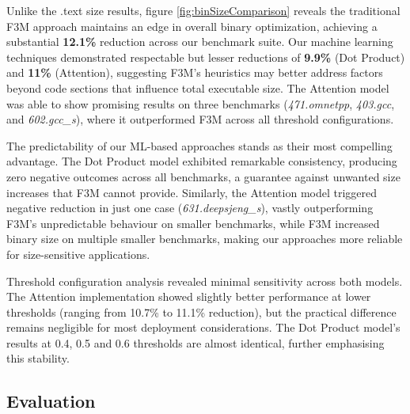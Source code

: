 Unlike the .text size results, figure \ref{fig:binSizeComparison} reveals the traditional F3M approach maintains an edge in overall binary optimization, achieving a substantial \textbf{12.1\%} reduction across our benchmark suite. Our machine learning techniques demonstrated respectable but lesser reductions of \textbf{9.9\%} (Dot Product) and \textbf{11\%} (Attention), suggesting F3M's heuristics may better address factors beyond code sections that influence total executable size. The Attention model was able to show promising results on three benchmarks (\textit{471.omnetpp}, \textit{403.gcc}, and \textit{602.gcc\_s}), where it outperformed F3M across all threshold configurations.

The predictability of our ML-based approaches stands as their most compelling advantage. The Dot Product model exhibited remarkable consistency, producing zero negative outcomes across all benchmarks, a guarantee against unwanted size increases that F3M cannot provide. Similarly, the Attention model triggered negative reduction in just one case (\textit{631.deepsjeng\_s}), vastly outperforming F3M's unpredictable behaviour on smaller benchmarks, while F3M increased binary size on multiple smaller benchmarks, making our approaches more reliable for size-sensitive applications.

Threshold configuration analysis revealed minimal sensitivity across both models. The Attention implementation showed slightly better performance at lower thresholds (ranging from 10.7\% to 11.1\% reduction), but the practical difference remains negligible for most deployment considerations. The Dot Product model's results at 0.4, 0.5 and 0.6 thresholds are almost identical, further emphasising this stability.

\subsection{Evaluation}




